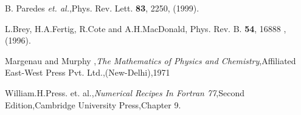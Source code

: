 \begin{references}
 B. Paredes {\sl et. al.},Phys. Rev. Lett. {\bf 83},
2250, (1999).

 L.Brey, H.A.Fertig, R.Cote and A.H.MacDonald, Phys. Rev.
B. {\bf 54}, 16888 , (1996).

 Margenau and Murphy ,{\it The Mathematics of Physics
and Chemistry},Affiliated East-West Press Pvt. Ltd.,(New-Delhi),1971

 William.H.Press. et. al.,{\it Numerical Recipes In
Fortran 77},Second Edition,Cambridge University Press,Chapter 9.
\end{references}

